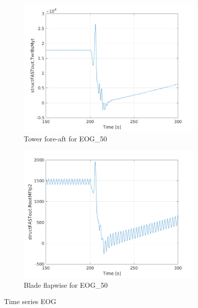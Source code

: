 \documentclass[10pt]{article}
\begin{document}
\begin{figure}[H]
  \centering
\begin{subfigure}{0.40\textwidth}
  \includegraphics[width=1\linewidth]{../CIP_6/FASTextreme/EOG_50/TwrBsMyt.png}
    \caption{Tower fore-aft for EOG\_50}
\end{subfigure}
\begin{subfigure}{0.40\textwidth}
  \includegraphics[width=1\linewidth]{../CIP_6/FASTextreme/EOG_50/RootMFlp2.png}
    \caption{Blade flapwise for EOG\_50}
\end{subfigure}
\caption{Time series EOG}
\label{fig:lc23signal}
\end{figure}
\end{document}
